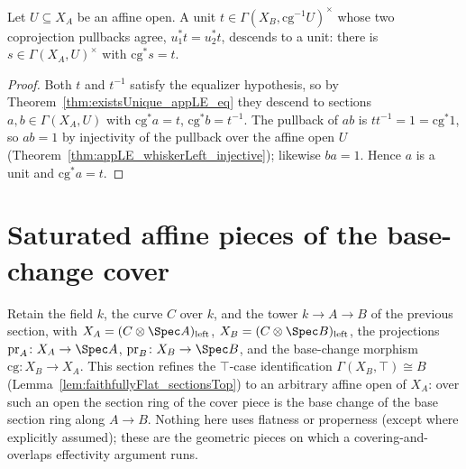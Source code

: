 \begin{theorem}
  \label{thm:exists_unitsAppLE_eq}
  \leanok
  Let \(U \subseteq X_A\) be an affine open. A unit \(t \in \Gamma(X_B,
  \mathrm{cg}^{-1}U)^{\times}\) whose two coprojection pullbacks agree, \(u_1^{*} t = u_2^{*}
  t\), descends to a unit: there is \(s \in \Gamma(X_A, U)^{\times}\) with \(\mathrm{cg}^{*} s =
  t\).
\end{theorem}
\begin{proof}
  \leanok
  Both \(t\) and \(t^{-1}\) satisfy the equalizer hypothesis, so by
  Theorem~\ref{thm:existsUnique_appLE_eq} they descend to sections \(a, b \in \Gamma(X_A, U)\)
  with \(\mathrm{cg}^{*} a = t\), \(\mathrm{cg}^{*} b = t^{-1}\).  The pullback of \(ab\) is \(t
  t^{-1} = 1 = \mathrm{cg}^{*} 1\), so \(ab = 1\) by injectivity of the pullback over the affine
  open \(U\) (Theorem~\ref{thm:appLE_whiskerLeft_injective}); likewise \(ba = 1\).  Hence \(a\)
  is a unit and \(\mathrm{cg}^{*} a = t\).
\end{proof}

\section{Saturated affine pieces of the base-change cover}
\label{sec:effectivityPieces}

Retain the field \(k\), the curve \(C\) over \(k\), and the tower \(k \to A \to B\) of the
previous section, with \(X_A = (C \otimes \Spec A)_{\mathrm{left}}\), \(X_B = (C \otimes \Spec
B)_{\mathrm{left}}\), the projections \(\mathrm{pr}_A \colon X_A \to \Spec A\), \(\mathrm{pr}_B
\colon X_B \to \Spec B\), and the base-change morphism \(\mathrm{cg} \colon X_B \to X_A\). This
section refines the \(\top\)-case identification \(\Gamma(X_B, \top) \cong B\)
(Lemma~\ref{lem:faithfullyFlat_sectionsTop}) to an arbitrary affine open of \(X_A\): over such an
open the section ring of the cover piece is the base change of the base section ring along \(A
\to B\). Nothing here uses flatness or properness (except where explicitly assumed); these are
the geometric pieces on which a covering-and-overlaps effectivity argument runs.


